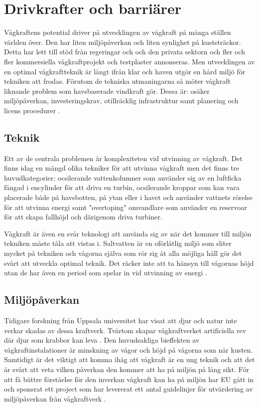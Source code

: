 \documentclass[10pt,a4paper,oneside]{article}
\begin{document}
\section{Drivkrafter och barriärer}
Vågkraftens potential driver på utvecklingen av vågkraft på många ställen världen över. Den har liten miljöpåverkan och liten synlighet på kuststräckor. Detta har lett till stöd från regeringar och och den privata sektorn och fler och fler kommersiella vågkraftprojekt och testplaster annonseras. Men utvecklingen av en optimal vågkraftteknik är långt ifrån klar och haven utgör en hård miljö för tekniken att frodas. Förutom de tekniska utmaningarna så möter vågkraft liknande problem som havsbaserade vindkraft gör. Dessa är: osäker miljöpåverkan, investeringskrav, otillräcklig infrastruktur samt planering och licens procedurer \cite{IRENA}.

\subsection{Teknik}
Ett av de centrala problemen är komplexiteten vid utvinning av vågkraft. Det finns idag en mängd olika tekniker för att utvinna vågkraft men det finns tre huvudkategorier:  ocsilerande vattenkolumner som använder sig av en luftficka fångad i encylinder för att driva en turbin, ocsilerande kroppar som kan vara placerade både på havsbotten, på ytan eller i havet och använder vattnets rörelse för att utvinna energi samt "overtoping" omvandlare som använder en reservoar för att skapa fallhöjd och därigenom driva turbiner.

Vågkraft är även en svår teknologi att använda sig av när det kommer till miljön tekniken måste tåla att vistas i. Saltvatten är en oförlåtlig miljö som sliter mycket på tekniken och vågorna själva som rör sig åt alla möjliga håll gör det svårt att utveckla optimal teknik. Det räcker inte att ta hänsyn till vågornas höjd utan de har även en period som spelar in vid utvinning av energi \cite{Yale}.


\subsection{Miljöpåverkan}
Tidigare forskning från Uppsala universitet har visat att djur och natur inte verkar skadas av dessa kraftverk. Tvärtom skapar vågkraftverket artificiella rev där djur som krabbor kan leva \cite{Vattenfall}. Den huvudsakliga bieffekten av vågkraftinstalationer är minskning av vågor och höjd på vågorna som når kusten. Samtidigt är det viktigt att komma ihåg att vågkraft är en ung teknik och att det är svårt att veta vilken påverkan den kommer att ha på miljön på lång sikt. För att få bättre förståelse för den inverkan vågkraft kan ha på miljön har EU gått in och sponsrat ett project som har levererat ett antal guidelinjer för utvärdering av miljöpåverkan från vågkraftverk \cite{IRENA}. 
\end{document}
